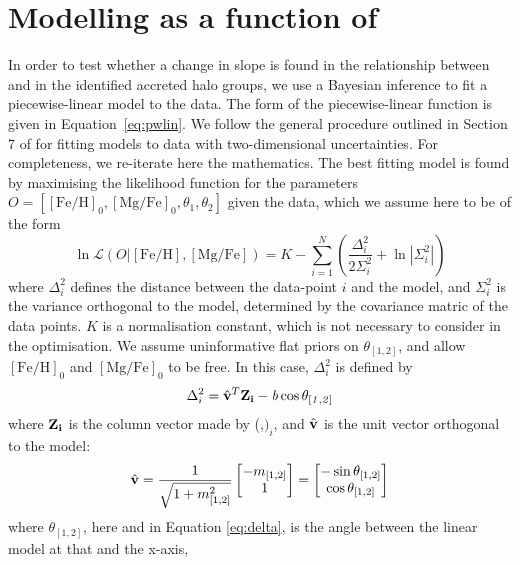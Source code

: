\section{Modelling \mgfe{} as a function of \feh{}}
\label{sec:appA}
In order to test whether a change in slope is found in the relationship
between \mgfe{} and \feh{} in the identified accreted halo groups,
we use a Bayesian inference to fit a piecewise-linear model to the
data. The form of the piecewise-linear function is given in
Equation~\ref{eq:pwlin}. We follow the general procedure outlined
in Section 7 of \citet{2010arXiv1008.4686H} for fitting models to
data with two-dimensional uncertainties. For completeness, we
re-iterate here the mathematics. The best fitting model is found
by maximising the likelihood function for the parameters $O =
[\mathrm{[Fe/H]}_0, \mathrm{[Mg/Fe]}_0, \theta_1, \theta_2]$ given
the data, which we assume here to be of the form
\begin{equation}
\ln{\mathcal{L}(O|\mathrm{[Fe/H]}, \mathrm{[Mg/Fe]})} = K -
\sum^{N}_{i=1}\left (\frac{\Delta_i^2}{2\Sigma^2_i} + \ln |\Sigma^{2}_i|\right)
\end{equation} 
where $\Delta_i^2$ defines the distance between the data-point $i$
and the model, and $\Sigma^2_i$ is the variance orthogonal to the
model, determined by the covariance matric of the data points. $K$
is a normalisation constant, which is not necessary to consider in
the optimisation. We assume uninformative flat priors on $\theta_{[1,2]}$,
and allow $\mathrm{[Fe/H]}_0$ and $\mathrm{[Mg/Fe]}_0$ to be free.
In this case, $\Delta_i^2$ is defined by
\begin{equation}
\label{eq:delta}
\Delta_i^2 = \hat{\bf{v}}^T \bf{Z}_i - \it{b} \cos\theta_{[1,2]}
\end{equation}
where $\bf{Z}_i$ is the column vector made by (\mgfe{},\feh{}$)_i$,
and $\hat{\bf{v}}$ is the unit vector orthogonal to the model:
\begin{equation}
\hat{\bf{v}} =
\frac{1}{\sqrt{1+m_{[1,2]}^2}}\begin{bmatrix}-m_{[1,2]}\\1\end{bmatrix} =
\begin{bmatrix}-\sin\theta_{[1,2]}\\\cos\theta_{[1,2]} \end{bmatrix}
\end{equation}
where $\theta_{[1,2]}$, here and in Equation \eqref{eq:delta}, is
the angle between the linear model at that \feh{} and the x-axis,
